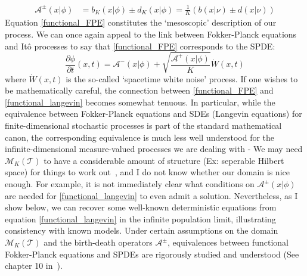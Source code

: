 \begin{align*}
   \mathcal{A}^{\pm}(x|\phi) &= b_K(x|\phi)\pm d_K(x|\phi) = \frac{1}{K}\left(b(x|\nu)\pm d(x|\nu)\right)
\end{align*}
Equation \eqref{functional_FPE} constitutes the `mesoscopic' description of our process. We can once again appeal to the link between Fokker-Planck equations and It\^o processes to say that \eqref{functional_FPE} corresponds to the SPDE:
\begin{equation}
\label{functional_langevin}
    \frac{\partial \phi}{\partial t}(x,t) = \mathcal{A}^{-}(x|\phi) + \sqrt{\frac{\mathcal{A}^{+}(x|\phi)}{K}}\dot{W}(x,t)
\end{equation}
where $\dot{W}(x,t)$ is the so-called `spacetime white noise' process.
If one wishes to be mathematically careful, the connection between \eqref{functional_FPE} and \eqref{functional_langevin} becomes somewhat tenuous. In particular, while the equivalence between Fokker-Planck equations and SDEs (Langevin equations) for finite-dimensional stochastic processes is part of the standard mathematical canon, the corresponding equivalence is much less well understood for the infinite-dimensional measure-valued processes we are dealing with - We may need $\mathcal{M}_{K}(\mathcal{T})$ to have a considerable amount of structure (Ex: seperable Hilbert space) for things to work out~\citep{da_prato_stochastic_2014,balan_gentle_2018}, and I do not know whether our domain is nice enough. For example, it is not immediately clear what conditions on $\mathcal{A}^{\pm}(x | \phi)$ are needed for \eqref{functional_langevin} to even admit a solution. Nevertheless, as I show below, we can recover some well-known deterministic equations from equation \eqref{functional_langevin} in the infinite population limit, illustrating consistency with known models. Under certain assumptions on the domain $\mathcal{M}_{K}(\mathcal{T})$ and the  birth-death operators $\mathcal{A}^{\pm}$, equivalences between functional Fokker-Planck equations and SPDEs are rigorously studied and understood (See chapter 10 in~\cite{bogachev_fokker-planck-kolmogorov_2015}).

